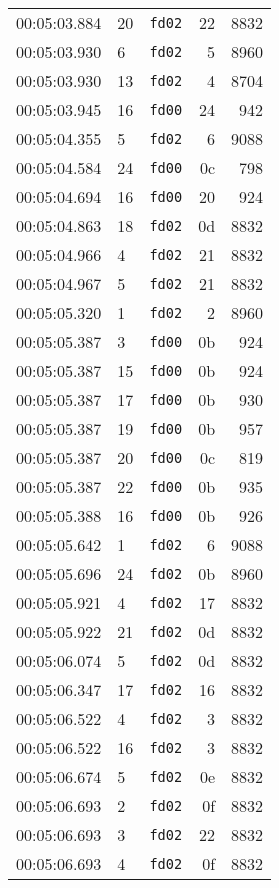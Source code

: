 \documentclass{article}
\begin{document}
\begin{longtable}{lllrr}
00:05:03.884 & 20 & \texttt{fd02} & 22 & 8832 \\
00:05:03.930 & 6 & \texttt{fd02} & 5 & 8960 \\
00:05:03.930 & 13 & \texttt{fd02} & 4 & 8704 \\
00:05:03.945 & 16 & \texttt{fd00} & 24 & 942 \\
00:05:04.355 & 5 & \texttt{fd02} & 6 & 9088 \\
00:05:04.584 & 24 & \texttt{fd00} & 0c & 798 \\
00:05:04.694 & 16 & \texttt{fd00} & 20 & 924 \\
00:05:04.863 & 18 & \texttt{fd02} & 0d & 8832 \\
00:05:04.966 & 4 & \texttt{fd02} & 21 & 8832 \\
00:05:04.967 & 5 & \texttt{fd02} & 21 & 8832 \\
00:05:05.320 & 1 & \texttt{fd02} & 2 & 8960 \\
00:05:05.387 & 3 & \texttt{fd00} & 0b & 924 \\
00:05:05.387 & 15 & \texttt{fd00} & 0b & 924 \\
00:05:05.387 & 17 & \texttt{fd00} & 0b & 930 \\
00:05:05.387 & 19 & \texttt{fd00} & 0b & 957 \\
00:05:05.387 & 20 & \texttt{fd00} & 0c & 819 \\
00:05:05.387 & 22 & \texttt{fd00} & 0b & 935 \\
00:05:05.388 & 16 & \texttt{fd00} & 0b & 926 \\
00:05:05.642 & 1 & \texttt{fd02} & 6 & 9088 \\
00:05:05.696 & 24 & \texttt{fd02} & 0b & 8960 \\
00:05:05.921 & 4 & \texttt{fd02} & 17 & 8832 \\
00:05:05.922 & 21 & \texttt{fd02} & 0d & 8832 \\
00:05:06.074 & 5 & \texttt{fd02} & 0d & 8832 \\
00:05:06.347 & 17 & \texttt{fd02} & 16 & 8832 \\
00:05:06.522 & 4 & \texttt{fd02} & 3 & 8832 \\
00:05:06.522 & 16 & \texttt{fd02} & 3 & 8832 \\
00:05:06.674 & 5 & \texttt{fd02} & 0e & 8832 \\
00:05:06.693 & 2 & \texttt{fd02} & 0f & 8832 \\
00:05:06.693 & 3 & \texttt{fd02} & 22 & 8832 \\
00:05:06.693 & 4 & \texttt{fd02} & 0f & 8832 \\

\end{longtable}
\end{document}
